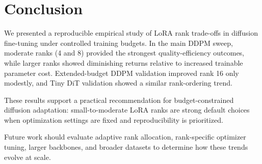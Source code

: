 \section{Conclusion}

We presented a reproducible empirical study of LoRA rank trade-offs in diffusion fine-tuning under controlled training budgets. In the main DDPM sweep, moderate ranks (4 and 8) provided the strongest quality-efficiency outcomes, while larger ranks showed diminishing returns relative to increased trainable parameter cost. Extended-budget DDPM validation improved rank 16 only modestly, and Tiny DiT validation showed a similar rank-ordering trend.

These results support a practical recommendation for budget-constrained diffusion adaptation: small-to-moderate LoRA ranks are strong default choices when optimization settings are fixed and reproducibility is prioritized.

Future work should evaluate adaptive rank allocation, rank-specific optimizer tuning, larger backbones, and broader datasets to determine how these trends evolve at scale.
